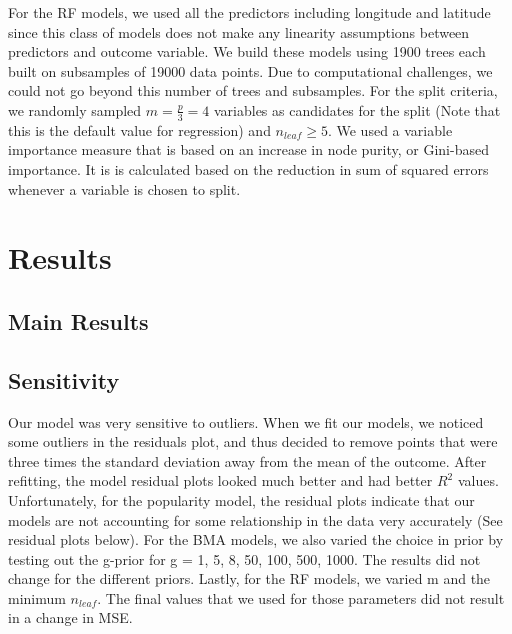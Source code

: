 \documentclass{article}
\begin{document}
For the RF models, we used all the predictors including longitude and latitude since this class of models does not make any linearity assumptions between predictors and outcome variable. We build these models using 1900 trees each built on subsamples of 19000 data points. Due to computational challenges, we could not go beyond this number of trees and subsamples. For the split criteria, we randomly sampled $m = \frac{p}{3} = 4$ variables as candidates for the split (Note that this is the default value for regression) and $n_{leaf} \geq 5$. We used a variable importance measure that is based on an increase in node purity, or Gini-based importance. It is is calculated based on the reduction in sum of squared errors whenever a variable is chosen to split.

\section{Results}

\subsection{Main Results}

\subsection{Sensitivity} 
Our model was very sensitive to outliers. When we fit our models, we noticed some outliers in the residuals plot, and thus decided to remove points that were three times the standard deviation away from the mean of the outcome. After refitting, the model residual plots looked much better and had better $R^2$ values. Unfortunately, for the popularity model, the residual plots indicate that our models are not accounting for some relationship in the data very accurately (See residual plots below). For the BMA models, we also varied the choice in prior by testing out the g-prior for g = 1, 5, 8, 50, 100, 500, 1000. The results did not change for the different priors. Lastly, for the RF models, we varied m and the minimum $n_{leaf}$. The final values that we used for those parameters did not result in a change in MSE. 
\end{document}
